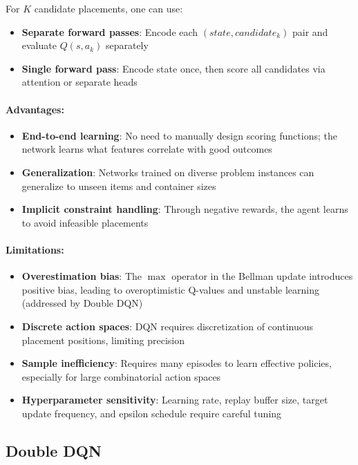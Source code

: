 For $K$ candidate placements, one can use:
\begin{itemize}
\item \textbf{Separate forward passes}: Encode each $(state, candidate_k)$ pair and evaluate $Q(s, a_k)$ separately
\item \textbf{Single forward pass}: Encode state once, then score all candidates via attention or separate heads
\end{itemize}

\paragraph{Advantages:}

\begin{itemize}
\item \textbf{End-to-end learning}: No need to manually design scoring functions; the network learns what features correlate with good outcomes
\item \textbf{Generalization}: Networks trained on diverse problem instances can generalize to unseen items and container sizes
\item \textbf{Implicit constraint handling}: Through negative rewards, the agent learns to avoid infeasible placements
\end{itemize}

\paragraph{Limitations:}

\begin{itemize}
\item \textbf{Overestimation bias}: The $\max$ operator in the Bellman update introduces positive bias, leading to overoptimistic Q-values and unstable learning (addressed by Double DQN)
\item \textbf{Discrete action spaces}: DQN requires discretization of continuous placement positions, limiting precision
\item \textbf{Sample inefficiency}: Requires many episodes to learn effective policies, especially for large combinatorial action spaces
\item \textbf{Hyperparameter sensitivity}: Learning rate, replay buffer size, target update frequency, and epsilon schedule require careful tuning
\end{itemize}


\subsection{Double DQN}

